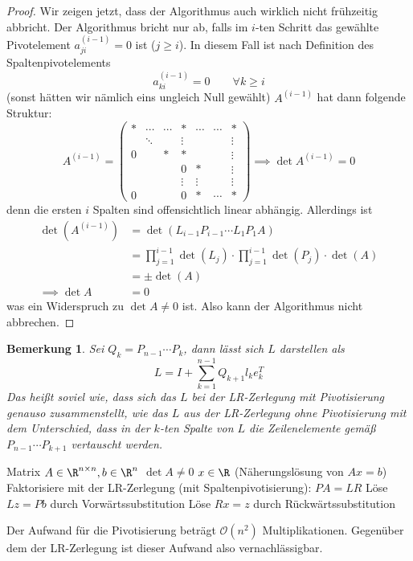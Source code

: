 \documentclass[a4paper]{scrartcl}
\numberwithin{equation}{section}
\newtheorem{notee}[thm]{Bemerkung}
\begin{document}
\begin{st}
\begin{proof}
		Wir zeigen jetzt, dass der Algorithmus auch wirklich nicht frühzeitig abbricht.
		Der Algorithmus bricht nur ab, falls im $i$-ten Schritt das gewählte Pivotelement $a_{ji}^{(i-1)} = 0$ ist ($j\ge i$).
		In diesem Fall ist nach Definition des Spaltenpivotelements
		\[
			a_{ki}^{(i-1)} = 0 \qquad \forall k\ge i
		\]
		(sonst hätten wir nämlich eins ungleich Null gewählt)
		$A^{(i-1)}$ hat dann folgende Struktur:
		\[
			A^{(i-1)} = \begin{pmatrix}
				* & \cdots & \cdots & *      & \cdots & \cdots & *\\
				  & \ddots &        & \vdots &        &        & \vdots\\
				0 &        & *      & *      &       &        & \vdots\\
				  &        &        & 0      & *      &        & \vdots\\
				  &   &        & \vdots & \vdots &        & \vdots\\
				0 & &  & 0      & *      & \cdots & *
			\end{pmatrix} \implies \det A^{(i-1)} = 0
		\]
		denn die ersten $i$ Spalten sind offensichtlich linear abhängig.
		Allerdings ist
		\begin{align*}
			\det( A^{(i-1)}) &= \det(L_{i-1}P_{i-1}\dotsb L_1P_1 A) \\
																	   &= \prod_{j=1}^{i-1}\det (L_j) \cdot \prod_{j=1}^{i-1}\det(P_j) \cdot \det(A)\\
												  &= \pm \det(A)\\
			\implies \det A &= 0
		\end{align*}
		was ein Widerspruch zu $\det A \neq 0$ ist.
		Also kann der Algorithmus nicht abbrechen.
	\end{proof}
\end{st}

\begin{notee}
	\label{note:3.9}
	Sei $Q_k = P_{n-1}\dotsb P_k$, dann lässt sich $L$ darstellen als
	\[
		L =  I + \sum_{k=1}^{n-1}Q_{k+1}l_ke_k^T
	\]
	Das heißt soviel wie, dass sich das $L$ bei der LR-Zerlegung mit Pivotisierung genauso zusammenstellt, wie das $L$ aus der LR-Zerlegung ohne Pivotisierung mit dem Unterschied, dass in der $k$-ten Spalte von $L$ die Zeilenelemente gemäß $P_{n-1}\dotsb P_{k+1}$ vertauscht werden.
\end{notee}

\setcounter{thm}{9}
\begin{alg}
	\label{alg:3.10}
	\begin{algorithmic}
		\Input Matrix $A\in \R^{n\times n}, b\in \R^n$
		\Assume $\det{A}\neq 0$
		\Output $x\in \R$ (Näherungslösung von $Ax=b$)
		\Statex
		\State Faktorisiere mit der LR-Zerlegung (mit Spaltenpivotisierung): $PA = LR$
		\State Löse $Lz = Pb$ durch Vorwärtssubstitution
		\State Löse $Rx = z$ durch Rückwärtssubstitution
	\end{algorithmic}
	Der Aufwand für die Pivotisierung beträgt $\mathcal O(n^2)$ Multiplikationen.
	Gegenüber dem der LR-Zerlegung ist dieser Aufwand also vernachlässigbar.
\end{alg}
\end{document}

